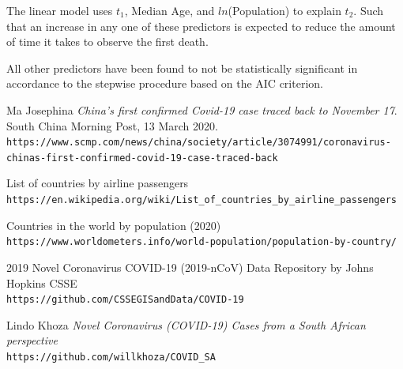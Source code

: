 \documentclass[]{report}
\begin{document}
The linear model uses $t_1$, Median Age, and $ln$(Population) to explain $t_2$. Such that an increase in any one of these predictors is expected to reduce the amount of time it takes to observe the first death.

All other predictors have been found to not be statistically significant in accordance to the stepwise procedure based on the AIC criterion.


\begin{thebibliography}{9}
	Ma Josephina 
	\textit{China's first confirmed Covid-19 case traced back to November 17}. 
	South China Morning Post, 13 March 2020.
	\\\texttt{https://www.scmp.com/news/china/society/article/3074991/coronavirus-chinas-first-confirmed-covid-19-case-traced-back}
	
	List of countries by airline passengers
	\\\texttt{https://en.wikipedia.org/wiki/List\_of\_countries\_by\_airline\_passengers}
	
	Countries in the world by population (2020)
	\\\texttt{https://www.worldometers.info/world-population/population-by-country/}
	
	2019 Novel Coronavirus COVID-19 (2019-nCoV) Data Repository by Johns Hopkins CSSE
	\\\texttt{https://github.com/CSSEGISandData/COVID-19}
	
	Lindo Khoza
	\textit{Novel Coronavirus (COVID-19) Cases from a South African perspective}
	\\\texttt{https://github.com/willkhoza/COVID\_SA}
	
\end{thebibliography}
\end{document}
